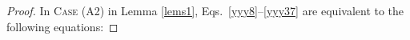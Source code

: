 \documentclass[11pt,letterpaper,reqno]{amsart}
\theoremstyle{definition}
\numberwithin{equation}{section}
\begin{document}
\begin{proof}
In C\textsc{ase} (A2) in Lemma \ref{lems1}, Eqs.~\eqref{yyy8}--\eqref{yyy37} are equivalent to the following equations:

\end{proof}
\end{document}
